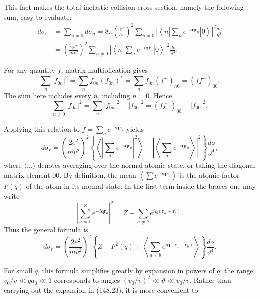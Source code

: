 This fact makes the total inelastic-collision cross-section, namely the following sum, easy to evaluate:
\begin{equation}
\begin{split}
 d\sigma_r&=\sum_{n\ne0}d\sigma_n
 =8\pi\left(\frac{e^2}{\hbar v}\right)^2\sum_{n\ne0}
 \left|\left\langle n\left|\sum_a e^{-i\mathbf q\mathbf r_a}\right|0\right\rangle\right|^2\frac{dq}{q^3}\\
 &=\left(\frac{2e^2}{mv^2}\right)^2\sum_{n\ne0}
 \left|\left\langle n\left|\sum_a e^{-i\mathbf q\mathbf r_a}\right|0\right\rangle\right|^2\frac{do}{\vartheta^4}.
\end{split}
 \tag{148.20}
\end{equation}

For any quantity $f$, matrix multiplication gives
\[
 \sum_n|f_{0n}|^2=\sum_nf_{0n}(f_{0n})^*=\sum_nf_{0n}(f^+)_{n0}=(ff^+)_{00}.
\]
The sum here includes every $n$, including $n=0$. Hence
\begin{equation}
 \sum_{n\ne0}|f_{0n}|^2=\sum_n|f_{0n}|^2-|f_{00}|^2=(ff^+)_{00}-|f_{00}|^2.
 \tag{148.21}
\end{equation}

Applying this relation to $f=\sum_a e^{-i\mathbf q\mathbf r_a}$ yields
\begin{equation}
 d\sigma_r=\left(\frac{2e^2}{mv^2}\right)^2
 \left\{\left\langle\left|\sum_a e^{-i\mathbf q\mathbf r_a}\right|^2\right\rangle
 -\left|\left\langle\sum_a e^{-i\mathbf q\mathbf r_a}\right\rangle\right|^2\right\}
 \frac{do}{\vartheta^4},
 \tag{148.22}
\end{equation}
where $\langle\ldots\rangle$ denotes averaging over the normal atomic state, or taking the diagonal matrix element 00. By definition, the mean $\left\langle\sum e^{-i\mathbf q\mathbf r_a}\right\rangle$ is the atomic factor $F(q)$ of the atom in its normal state. In the first term inside the braces one may write
\[
 \left|\sum_{a=1}^Z e^{-i\mathbf q\mathbf r_a}\right|^2
 =Z+\sum_{a\ne b}e^{i\mathbf q(\mathbf r_a-\mathbf r_b)}.
\]
Thus the general formula is
\begin{equation}
 d\sigma_r=\left(\frac{2e^2}{mv^2}\right)^2
 \left\{Z-F^2(q)+\left\langle\sum_{a\ne b}e^{i\mathbf q(\mathbf r_a-\mathbf r_b)}\right\rangle\right\}
 \frac{do}{\vartheta^4}.
 \tag{148.23}
\end{equation}

For small $q$, this formula simplifies greatly by expansion in powers of $q$; the range $v_0/v\ll qa_0\ll1$ corresponds to angles $(v_0/v)^2\ll\vartheta\ll v_0/v$. Rather than carrying out the expansion in (148.23), it is more convenient to%

